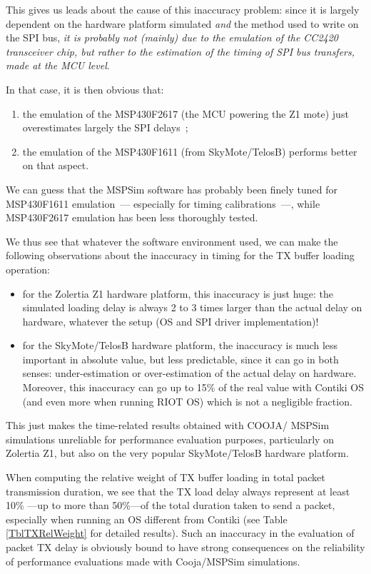 \documentclass[10pt,emptycopyrightspace]{ewsn-proc}
\begin{document}
\medskip

This gives us leads about the cause of this inaccuracy problem: since
it is largely dependent on the hardware platform simulated \emph{and} the
method used to write on the SPI bus, \emph{it is probably not (mainly) due
to the emulation of the CC2420 transceiver chip, but rather to the
estimation of the timing of SPI bus transfers, made at the MCU level}.

In that case, it is then obvious that:
\begin{enumerate}[label=\textit{\alph*}.\rbrack]
\item the emulation of the MSP430F2617 (the MCU powering the Z1 mote)
just overestimates largely the SPI delays~;
\item the emulation of the MSP430F1611 (from SkyMote/TelosB) performs
better on that aspect.
\end{enumerate}
\smallskip
We can guess that the MSPSim software has probably been finely tuned for
MSP430F1611 emulation~--- especially for timing calibrations~---, while
MSP430F2617 emulation has been less thoroughly tested.

\medskip

We thus see that whatever the software environment used, we can make the
following observations about the inaccuracy in timing for the TX buffer
loading operation:
\begin{itemize}
\item for the Zolertia Z1 hardware platform, this inaccuracy is just huge:
the simulated loading delay is always 2 to 3 times larger than the actual
delay on hardware, whatever the setup (OS and SPI driver implementation)!
\item for the SkyMote/TelosB hardware platform, the inaccuracy is much less
important in absolute value, but less predictable, since it can go in both
senses: under-estimation or over-estimation of the actual delay on hardware.
Moreover, this inaccuracy can go up to 15\% of the real value with Contiki
OS (and even more when running RIOT OS) which is not a negligible fraction.
\end{itemize}
\smallskip
This just makes the time-related results obtained with COOJA/ MSPSim
simulations unreliable for performance evaluation purposes, particularly
on Zolertia Z1, but also on the very popular SkyMote/TelosB hardware platform.

\medskip

When computing the relative weight of TX buffer loading in total packet
transmission duration, we see that the TX load delay always represent at
least 10\% ---up to more than 50\%---of the total duration taken to send
a packet, especially when running an OS different from Contiki (see Table
\ref{TblTXRelWeight} for detailed results).
Such an inaccuracy in the evaluation of packet TX delay is obviously bound
to have strong consequences on the reliability of performance evaluations
made with Cooja/MSPSim simulations.
\end{document}
